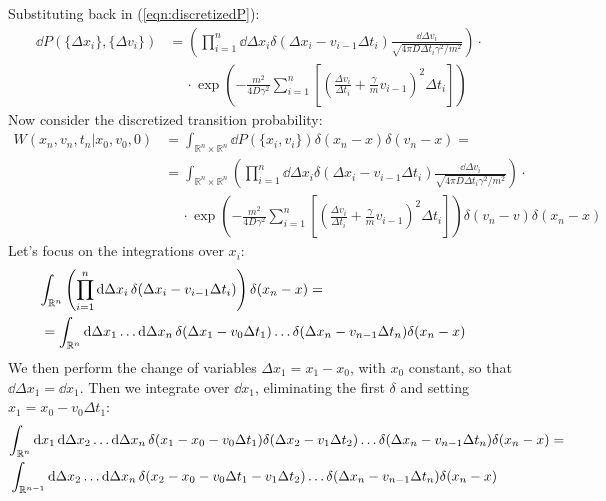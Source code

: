 \documentclass[../template.tex]{subfiles}
\begin{document}
Substituting back in (\ref{eqn:discretizedP}):
\begin{align*}
    \dd{P}(\{\Delta x_i\}, \{\Delta v_i\}) &=  \left(\prod_{i=1}^n \dd{\Delta x_i} \delta(\Delta x_i - v_{i-1} \Delta t_i) \frac{\dd{\Delta v_i}}{\sqrt{4 \pi D \Delta t_i \gamma^2 / m^2 }}  \right) \cdot\\\nonumber
    &\quad \> \cdot \exp\left(-\frac{m^2}{4 D \gamma^2} \sum_{i=1}^n  \left[\left(\frac{\Delta v_i}{\Delta t_i} + \frac{\gamma}{m} v_{i-1}   \right)^2 \Delta t_i \right]  \right)
\end{align*}
Now consider the discretized transition probability:
\begin{align} \label{eqn:disW}
    W(x_n, v_n, t_n|x_0,v_0,0) &= \int_{\mathbb{R}^n \times \mathbb{R}^n} \dd{P}(\{x_i,v_i\}) \delta(x_n - x) \delta(v_n - x) =\\ \nonumber
    &= \int_{\mathbb{R}^n \times \mathbb{R}^n}   \left(\prod_{i=1}^n \dd{\Delta x_i} \delta(\Delta x_i - v_{i-1} \Delta t_i) \frac{\dd{\Delta v_i}}{\sqrt{4 \pi D \Delta t_i \gamma^2 / m^2 }}  \right) \cdot\\\nonumber
    &\quad \> \cdot \exp\left(-\frac{m^2}{4 D \gamma^2} \sum_{i=1}^n  \left[\left(\frac{\Delta v_i}{\Delta t_i} + \frac{\gamma}{m} v_{i-1}   \right)^2 \Delta t_i \right]  \right) \delta(v_n - v) \delta(x_n - x)
\end{align} 
Let's focus on the integrations over $x_i$:
\begin{align*}
    \int_{\mathbb{R}^n} \left(\prod_{i=1}^n \dd{\Delta x_i} \delta(\Delta x_i - v_{i-1} \Delta t_i)\right) \delta(x_n - x) =\\
    \span= \int_{\mathbb{R}^n} \dd{\Delta x_1}\dots \dd{\Delta x_n} \delta(\Delta x_1 - v_0 \Delta t_1)\dots \delta(\Delta x_n - v_{n-1} \Delta t_n ) \delta(x_n - x)
\end{align*}
We then perform the change of variables $\Delta x_1 = x_1 - x_0$, with $x_0$ constant, so that $\dd{\Delta x_1} = \dd{x_1}$. Then we integrate over $\dd{x_1}$, eliminating the first $\delta$ and setting $x_1 = x_0 - v_0 \Delta t_1$:
\begin{align*}
    \int_{\mathbb{R}^n} \dd{x_1} \dd{\Delta x_2} \dots \dd{\Delta x_n} \delta(x_1 - x_0 - v_0 \Delta t_1) \delta(\Delta x_2 - v_1 \Delta t_2) \dots \delta(\Delta x_n - v_{n-1} \Delta t_n) \delta(x_n - x) =\\
    \span \int_{\mathbb{R}^{n-1}} \dd{\Delta x_2} \dots \dd{\Delta x_n} \delta(x_2 - x_0 - v_0 \Delta t_1 - v_1 \Delta t_2) \dots \delta(\Delta x_n - v_{n-1} \Delta t_n) \delta (x_n - x)
\end{align*}
\end{document}
